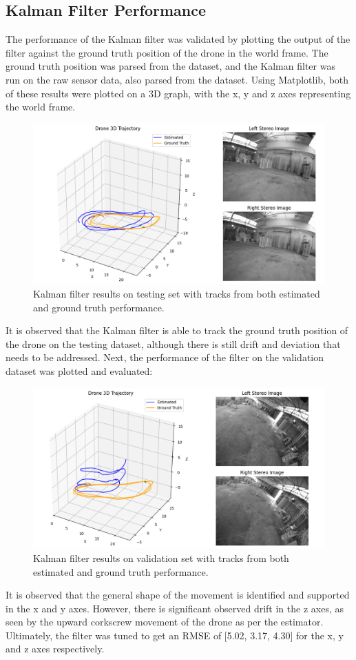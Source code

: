 \documentclass[bare_jrnl_transmag]{subfiles}
\begin{document}
\subsection{Kalman Filter Performance}
The performance of the Kalman filter was validated by plotting the output of the filter against the ground truth position of the drone in the world frame. The ground truth position was parsed from the dataset, and the Kalman filter was run on the raw sensor data, also parsed from the dataset. Using Matplotlib, both of these results were plotted on a 3D graph, with the x, y and z axes representing the world frame.

\begin{figure}[H]
    \centering
    \includegraphics[width=0.8\linewidth]{figures/kf_results.png}
    \caption{Kalman filter results on testing set with tracks from both estimated and ground truth performance.}
    \label{fig:kalman_results_test_set}
\end{figure}

It is observed that the Kalman filter is able to track the ground truth position of the drone on the testing dataset, although there is still drift and deviation that needs to be addressed. Next, the performance of the filter on the validation dataset was plotted and evaluated:

\begin{figure}[H]
    \centering
    \includegraphics[width=0.8\linewidth]{figures/kf_validation_results.png}
    \caption{Kalman filter results on validation set with tracks from both estimated and ground truth performance.}
    \label{fig:kalman_results_validation_set}
\end{figure}

It is observed that the general shape of the movement is identified and supported in the x and y axes. However, there is significant observed drift in the z axes, as seen by the upward corkscrew movement of the drone as per the estimator. Ultimately, the filter was tuned to get an RMSE of [5.02, 3.17, 4.30] for the x, y and z axes respectively.
\end{document}
